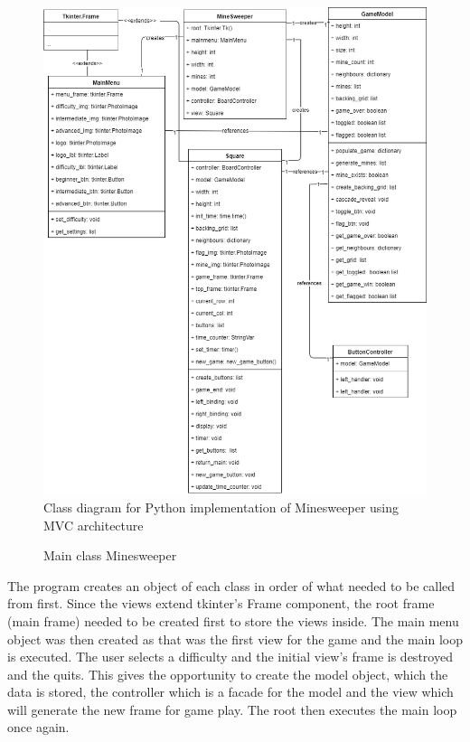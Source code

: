 \documentclass[12pt, a4]{report}
\begin{document}
	\begin{figure}[!h]
		\centering
		\includegraphics[scale=0.5]{classdiagram}
		\caption{Class diagram for Python implementation of Minesweeper using MVC architecture}
	\end{figure}
	\pagebreak
	
	\begin{figure}[!h]
		
		\caption{Main class Minesweeper}
	\end{figure}
	
	\par The program creates an object of each class in order of what needed to be called from first. Since the views extend tkinter's Frame component, the root frame (main frame) needed to be created first to store the views inside. The main menu object was then created as that was the first view for the game and the main loop is executed. The user selects a difficulty and the initial view's frame is destroyed and the quits. This gives the opportunity to create the model object, which the data is stored, the controller which is a facade for the model and the view which will generate the new frame for game play. The root then executes the main loop once again. 
	
\end{document}
